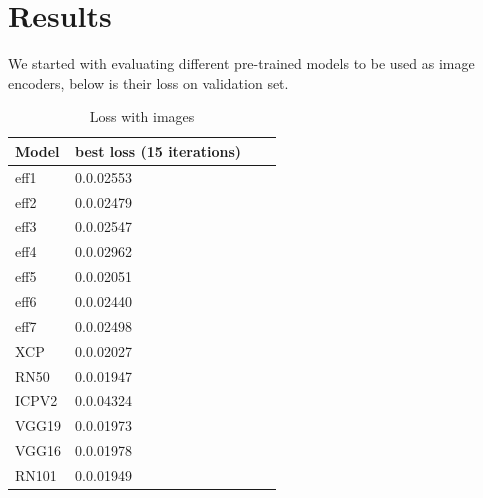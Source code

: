\documentclass{article}
\begin{document}
\section{Results}
We started with evaluating different pre-trained models to be used as image encoders, below is their loss on validation set. 
\begin{table}[h]
\begin{center}
\begin{tabular}{| l | l | l | l |}
\hline
Model & best loss (15 iterations) \\ \hline
eff1 & 0.0.02553 \\ \hline
eff2 & 0.0.02479 \\ \hline
eff3 & 0.0.02547\\ \hline
eff4 & 0.0.02962\\ \hline
eff5 & 0.0.02051\\ \hline
eff6 & 0.0.02440\\ \hline
eff7 & 0.0.02498\\ \hline
XCP  & 0.0.02027\\ \hline
RN50 & 0.0.01947\\ \hline
ICPV2 & 0.0.04324\\ \hline
VGG19 & 0.0.01973\\ \hline
VGG16 & 0.0.01978\\ \hline
RN101 & 0.0.01949\\ \hline
\end{tabular}
\end{center}
\caption{\label{tab:table-4}Loss with images}
\end{table}
\end{document}

